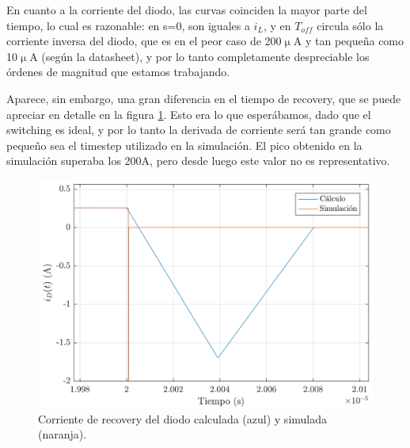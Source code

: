 \documentclass[e4_tp1_main.tex]{subfiles}
\begin{document}
En cuanto a la corriente del diodo, las curvas coinciden la mayor parte del tiempo, lo cual es razonable: en s=0, son iguales a $i_L$, y en $T_{off}$  circula s\'olo la corriente inversa del diodo, que es en el peor caso de 200$\upmu$A y tan peque\~na como 10$\upmu$A (seg\'un la datasheet), y por lo tanto completamente despreciable los \'ordenes de magnitud que estamos trabajando.

Aparece, sin embargo, una gran diferencia en el tiempo de recovery, que se puede apreciar en detalle en la figura \ref{fig:id-recovery}. Esto era lo que esper\'abamos, dado que el switching es ideal, y por lo tanto la derivada de corriente ser\'a tan grande como peque\~no sea el timestep utilizado en la simulaci\'on. El pico obtenido en la simulaci\'on superaba los 200A, pero desde luego este valor no es representativo. 

\begin{figure}[th]
	\centering
	\includegraphics[scale=0.75]{images/ej2/id-recovery.png}
	\caption{Corriente de recovery del diodo calculada (azul) y simulada (naranja).}
	\label{fig:id-recovery}
\end{figure}
\end{document}
